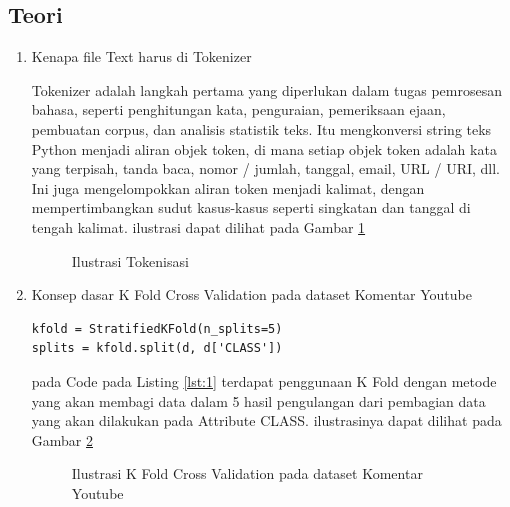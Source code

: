 \subsection{Teori}
\begin{enumerate}
\item Kenapa file Text harus di Tokenizer
\par Tokenizer adalah langkah pertama yang diperlukan dalam tugas pemrosesan bahasa, seperti penghitungan kata, penguraian, pemeriksaan ejaan, pembuatan corpus, dan analisis statistik teks. Itu mengkonversi string teks Python menjadi aliran objek token, di mana setiap objek token adalah kata yang terpisah, tanda baca, nomor / jumlah, tanggal, email, URL / URI, dll. Ini juga mengelompokkan aliran token menjadi kalimat, dengan mempertimbangkan sudut kasus-kasus seperti singkatan dan tanggal di tengah kalimat. ilustrasi dapat dilihat pada Gambar \ref{data1}

\begin{figure}[!htbp]
      \caption{Ilustrasi Tokenisasi}
      \label{data1}
\end{figure}

\item Konsep dasar K Fold Cross Validation pada dataset Komentar Youtube

\begin{lstlisting}[caption=K Fold Cross Validation,label={lst:1}]
kfold = StratifiedKFold(n_splits=5)
splits = kfold.split(d, d['CLASS'])
\end{lstlisting}

\par pada Code pada Listing \ref{lst:1} terdapat penggunaan K Fold dengan metode yang akan membagi data dalam 5 hasil pengulangan dari pembagian data yang akan dilakukan pada Attribute CLASS. ilustrasinya dapat dilihat pada Gambar \ref{data2}

\begin{figure}[!htbp]
      \caption{Ilustrasi  K Fold Cross Validation pada dataset Komentar Youtube}
      \label{data2}
\end{figure}


\end{enumerate}
